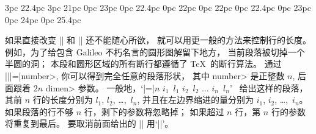 \danger
{}
3pc 22.4pc
3pc 21pc
0pc 23pc
0pc 22.4pc
0pc 22pc
0pc 22pc
0pc 22.4pc
0pc 23pc
0pc 24pc
0pc 25.4pc
%
\strut 如果直接改变 |\leftskip| 和 |\rightskip| 还不能随心所欲，
就可以用更一般的方法来控制行的长度。%
例如，为了给包含 Galileo 不朽名言的圆形图解留下地方，
当前段落被切掉一个半圆的洞；
本段和圆形区域的所有断行都遵循了 \TeX\ 的断行算法。%
通过 |\parshape||=|\<number>, 你可以得到完全任意的段落形状，
其中 \<number> 是正整数 $n$, 后面跟着 $2n$ \<dimen> 参数。%
一般地，`|\parshape=|$n$ $i_1$~$l_1$ $i_2$~$l_2$ $\ldots$ $i_n$~$l_n$'~%
给出这样的段落，其前 $n$ 行的长度分别为 $l_1$, $l_2$, \dots,~$l_n$,
并且在左边界缩进的量分别为 $i_1$, $i_2$, \dots,~$i_n$。%
如果段落的行不够 $n$ 行，剩下的参数将忽略掉；
如果超过 $n$ 行，第 $n$ 行的参数将重复到最后。%
要取消前面给出的 |\parshape| 用`||'。

